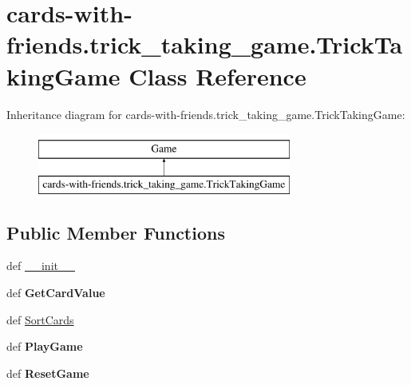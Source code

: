 \hypertarget{classcards-with-friends_1_1trick__taking__game_1_1_trick_taking_game}{\section{cards-\/with-\/friends.trick\-\_\-taking\-\_\-game.\-Trick\-Taking\-Game Class Reference}
\label{classcards-with-friends_1_1trick__taking__game_1_1_trick_taking_game}
}
Inheritance diagram for cards-\/with-\/friends.trick\-\_\-taking\-\_\-game.\-Trick\-Taking\-Game\-:\begin{figure}[H]
\begin{center}
\leavevmode
\includegraphics[height=2.000000cm]{classcards-with-friends_1_1trick__taking__game_1_1_trick_taking_game}
\end{center}
\end{figure}
\subsection*{Public Member Functions}
\begin{DoxyCompactItemize}
\item 
def \hyperlink{classcards-with-friends_1_1trick__taking__game_1_1_trick_taking_game_afd245781babd93951cf0dd612deb17d6}{\-\_\-\-\_\-init\-\_\-\-\_\-}
\item 
\hypertarget{classcards-with-friends_1_1trick__taking__game_1_1_trick_taking_game_a9389357f1f1838396c08c55363f17d68}{def {\bfseries Get\-Card\-Value}}\label{classcards-with-friends_1_1trick__taking__game_1_1_trick_taking_game_a9389357f1f1838396c08c55363f17d68}

\item 
def \hyperlink{classcards-with-friends_1_1trick__taking__game_1_1_trick_taking_game_a61a2f87ee4399c3d769f8feeff654521}{Sort\-Cards}
\item 
\hypertarget{classcards-with-friends_1_1trick__taking__game_1_1_trick_taking_game_ab6d7fb3479e1fe455aabf6d592c10581}{def {\bfseries Play\-Game}}\label{classcards-with-friends_1_1trick__taking__game_1_1_trick_taking_game_ab6d7fb3479e1fe455aabf6d592c10581}

\item 
\hypertarget{classcards-with-friends_1_1trick__taking__game_1_1_trick_taking_game_a93a0386100d04aa81a6d1bac32611c5b}{def {\bfseries Reset\-Game}}\label{classcards-with-friends_1_1trick__taking__game_1_1_trick_taking_game_a93a0386100d04aa81a6d1bac32611c5b}

\end{DoxyCompactItemize}


